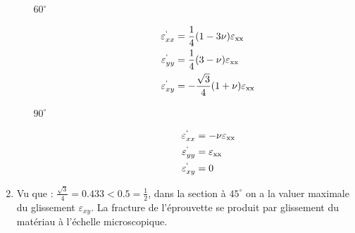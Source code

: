 \documentclass
[
a4paper,                      %
twoside,					  %
12pt,                         %
abstract,		      %
fleqn,                        %
]
{scrartcl} %
\begin{document}
\begin{enumerate}
\begin{itemize}
\begin{description}
\item [$60^{\circ}$]


\begin{equation}
\begin{aligned}
\varepsilon_{xx}^{`}&=\frac{1}{4} (1-3 \nu ) \varepsilon _{\text{xx}}\\
\varepsilon_{yy}^{`}&=\frac{1}{4} (3-\nu ) \varepsilon _{\text{xx}} \\
\varepsilon_{xy}^{`}&=-\frac{ \sqrt{3}}{4} (1+\nu ) \varepsilon _{\text{xx}} \\
\end{aligned}
\end{equation}

\item [$90^{\circ}$]
  
\begin{equation}
\begin{aligned}
\varepsilon_{xx}^{`}&=-\nu  \varepsilon _{\text{xx}}\\
\varepsilon_{yy}^{`}&=\varepsilon _{\text{xx}}\\
\varepsilon_{xy}^{`}&=0 \\
\end{aligned}
\end{equation}

\end{description}

\end{itemize}

\item Vu que : $\frac{\sqrt{3}}{4}=0.433<0.5=\frac{1}{2}$, dans la section \`a $45^{\circ}$ on a la valuer maximale du glissement $\varepsilon_{xy}$. La fracture de l'\'eprouvette se produit par glissement du mat\'eriau \`a l'\'echelle microscopique.
\end{enumerate}


%

\end{document}
